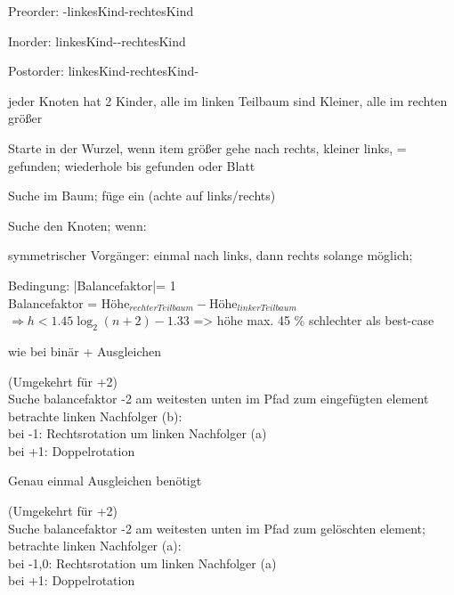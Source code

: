 

Preorder: -linkesKind-rechtesKind

Inorder: linkesKind--rechtesKind

Postorder: linkesKind-rechtesKind-

jeder Knoten hat 2 Kinder, alle im linken Teilbaum sind Kleiner, alle im rechten größer

Starte in der Wurzel, wenn item größer gehe nach rechts, kleiner links, = gefunden; wiederhole bis gefunden oder Blatt 
 
 Suche im Baum; füge ein (achte auf links/rechts)
 
Suche den Knoten; wenn:

symmetrischer Vorgänger: einmal nach links, dann rechts solange möglich;

Bedingung: |Balancefaktor|= 1 \\
Balancefaktor = $\text{Höhe}_{rechter Teilbaum} - \text{Höhe}_{linker Teilbaum} $\\
$ \Rightarrow h < 1.45 \log_2(n+2)-1.33$ => höhe max. 45 \% schlechter als best-case

 wie bei binär + Ausgleichen


(Umgekehrt für +2)\\
Suche balancefaktor -2 am weitesten unten im Pfad zum eingefügten element\\
betrachte linken Nachfolger (b):\\
bei -1: Rechtsrotation um linken Nachfolger (a)\\
bei +1: Doppelrotation

Genau einmal Ausgleichen benötigt




(Umgekehrt für +2)\\
Suche balancefaktor -2 am weitesten unten im Pfad zum gelöschten element;\\
betrachte linken Nachfolger (a):\\
bei -1,0: Rechtsrotation um linken Nachfolger (a)\\
bei +1: Doppelrotation


